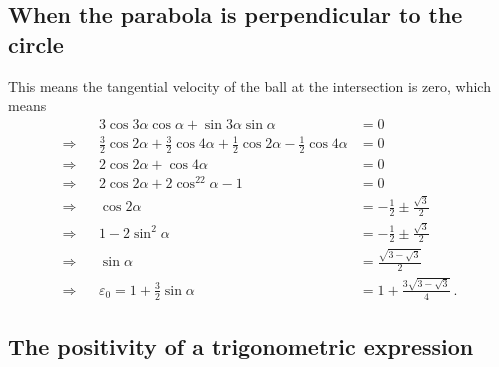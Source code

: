 \documentclass[]{article}
\begin{document}
\subsection{When the parabola is perpendicular to the circle}
\label{sec:perp}
This means the tangential velocity of the ball at the intersection is zero, which means
\begin{align*}
&&3\cos3\alpha\cos\alpha+\sin3\alpha\sin\alpha&=0 \\
\Rightarrow && \frac{3}{2}\cos2\alpha+\frac{3}{2}\cos4\alpha+\frac{1}{2}\cos2\alpha-\frac{1}{2}\cos4\alpha &= 0\\
\Rightarrow &&2\cos2\alpha+\cos4\alpha &= 0 \\
\Rightarrow &&2\cos2\alpha+2\cos^22\alpha-1 &=0\\
\Rightarrow &&\cos2\alpha &= -\frac{1}{2}\pm\frac{\sqrt{3}}{2}\\
\Rightarrow &&1-2\sin^2\alpha &= -\frac{1}{2}\pm\frac{\sqrt{3}}{2} \\
\Rightarrow &&\sin\alpha &= \frac{\sqrt{3-\sqrt{3}}}{2}\\
\Rightarrow &&\varepsilon_0 = 1+\frac{3}{2}\sin\alpha&=1+\frac{3\sqrt{3-\sqrt{3}}}{4}\,.
\end{align*}

\subsection{The positivity of a trigonometric expression}
\label{sec:RHS-positive}
\end{document}
